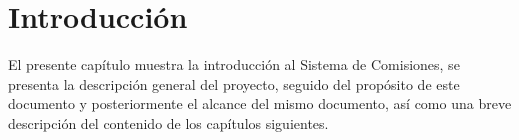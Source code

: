 \chapter{Introducción}

El presente capítulo muestra la introducción al Sistema de Comisiones, se presenta la descripción general del proyecto, seguido del propósito de este documento y posteriormente el alcance del mismo documento, así como una breve descripción del contenido de los capítulos siguientes.
	
	
	
	
	
	

